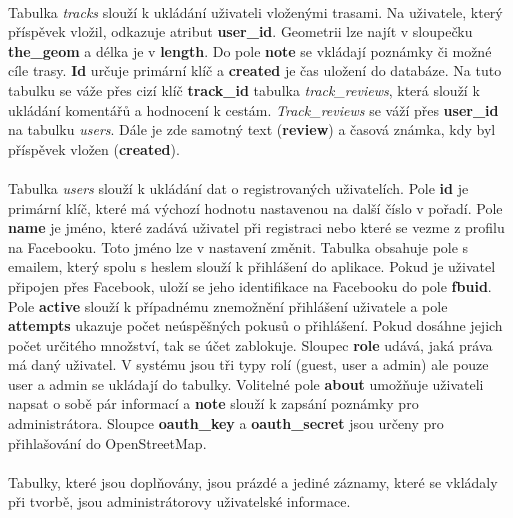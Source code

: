 \documentclass[11pt,a4paper,titlepage,oneside]{book}
\begin{document}

			\paragraph{} Tabulka \textit{tracks} slouží k ukládání uživateli vloženými trasami. Na uživatele, který příspěvek vložil, odkazuje atribut \textbf{user\_id}. Geometrii lze najít v sloupečku \textbf{the\_geom} a délka je v \textbf{length}. Do pole \textbf{note} se vkládají poznámky či možné cíle trasy. \textbf{Id} určuje primární klíč a \textbf{created} je čas uložení do databáze. Na tuto tabulku se váže přes cizí klíč \textbf{track\_id} tabulka \textit{track\_reviews}, která slouží k ukládání komentářů a hodnocení k cestám. \textit{Track\_reviews} se váží přes \textbf{user\_id} na tabulku \textit{users}. Dále je zde samotný text (\textbf{review}) a časová známka, kdy byl příspěvek vložen (\textbf{created}).
			\paragraph{}Tabulka \textit{users} slouží k ukládání dat o registrovaných uživatelích. Pole \textbf{id} je primární klíč, které má výchozí hodnotu nastavenou na další číslo v pořadí. Pole \textbf{name} je jméno, které zadává uživatel při registraci nebo které se vezme z profilu na Facebooku. Toto jméno lze v nastavení změnit. Tabulka obsahuje pole s emailem, který spolu s heslem slouží k přihlášení do aplikace. Pokud je uživatel připojen přes Facebook, uloží se jeho identifikace na Facebooku do pole \textbf{fbuid}. Pole \textbf{active} slouží k případnému znemožnění přihlášení uživatele a pole \textbf{attempts} ukazuje počet neúspěšných pokusů o přihlášení. Pokud dosáhne jejich počet určitého množství, tak se účet zablokuje. Sloupec \textbf{role} udává, jaká práva má daný uživatel. V systému jsou tři typy rolí (guest, user a admin) ale pouze user a admin se ukládají do tabulky. Volitelné pole \textbf{about} umožňuje uživateli napsat o sobě pár informací a \textbf{note} slouží k zapsání poznámky pro administrátora. Sloupce \textbf{oauth\_key} a \textbf{oauth\_secret} jsou určeny pro přihlašování do OpenStreetMap.


			\paragraph{}Tabulky, které jsou doplňovány, jsou prázdé a jediné záznamy, které se vkládaly při tvorbě, jsou administrátorovy uživatelské informace.
\end{document}
